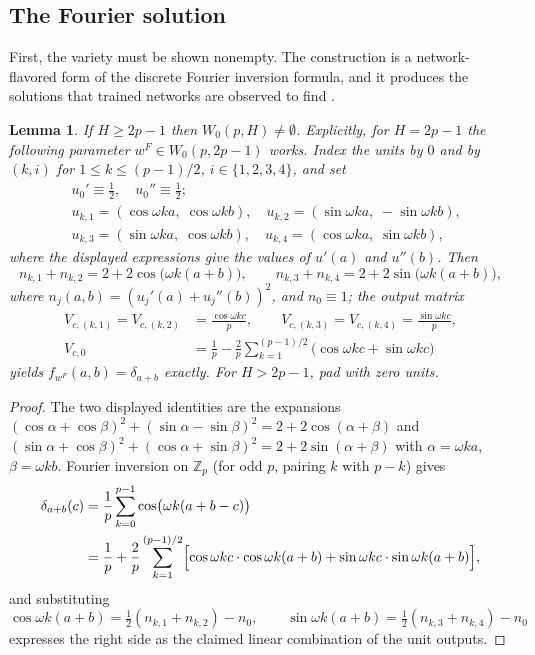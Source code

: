 \documentclass[11pt]{amsart}
\theoremstyle{plain}
\newtheorem{lemma}[theorem]{Lemma}
\theoremstyle{definition}
\newcommand{\Z}{\mathbb{Z}}
\begin{document}
\subsection{The Fourier solution}

First, the variety must be shown nonempty. The construction is a network-flavored form of the discrete Fourier inversion formula, and it produces the solutions that trained networks are observed to find \cite{nanda2023, gromov2023}.

\begin{lemma}\label{lem:fourier}
If $H \ge 2p - 1$ then $W_0(p, H) \neq \emptyset$. Explicitly, for $H = 2p-1$ the following parameter $w^F \in W_0(p, 2p-1)$ works. Index the units by $0$ and by $(k, i)$ for $1 \le k \le (p-1)/2$, $i \in \{1,2,3,4\}$, and set
\[
\begin{aligned}
&u_0' \equiv \tfrac12, \quad u_0'' \equiv \tfrac12; \\
&u_{k,1} = (\cos \omega k a,\; \cos \omega k b), \quad
u_{k,2} = (\sin \omega k a,\; -\sin \omega k b), \\
&u_{k,3} = (\sin \omega k a,\; \cos \omega k b), \quad
u_{k,4} = (\cos \omega k a,\; \sin \omega k b),
\end{aligned}
\]
where the displayed expressions give the values of $u'(a)$ and $u''(b)$. Then
\[
   n_{k,1} + n_{k,2} = 2 + 2\cos\bigl(\omega k (a+b)\bigr), \qquad
   n_{k,3} + n_{k,4} = 2 + 2\sin\bigl(\omega k (a+b)\bigr),
\]
where $n_j(a,b) = (u_j'(a) + u_j''(b))^2$, and $n_0 \equiv 1$; the output matrix
\begin{align*}
   V_{c,(k,1)} = V_{c,(k,2)} &= \frac{\cos \omega k c}{p}, \qquad
   V_{c,(k,3)} = V_{c,(k,4)} = \frac{\sin \omega k c}{p}, \\
   V_{c,0} &= \frac1p - \frac{2}{p}\sum_{k=1}^{(p-1)/2} \bigl(\cos \omega k c + \sin \omega k c\bigr)
\end{align*}
yields $f_{w^F}(a,b) = \delta_{a+b}$ exactly. For $H > 2p-1$, pad with zero units.
\end{lemma}

\begin{proof}
The two displayed identities are the expansions $(\cos\alpha + \cos\beta)^2 + (\sin\alpha - \sin\beta)^2 = 2 + 2\cos(\alpha+\beta)$ and $(\sin\alpha + \cos\beta)^2 + (\cos\alpha + \sin\beta)^2 = 2 + 2\sin(\alpha+\beta)$ with $\alpha = \omega k a$, $\beta = \omega k b$. Fourier inversion on $\Z_p$ (for odd $p$, pairing $k$ with $p - k$) gives
\begin{align*}
   \delta_{a+b}(c) &= \frac1p \sum_{k=0}^{p-1} \cos\bigl(\omega k (a+b-c)\bigr) \\
   &= \frac1p + \frac2p \sum_{k=1}^{(p-1)/2} \Bigl[ \cos \omega k c \cdot \cos \omega k (a+b) + \sin \omega k c \cdot \sin \omega k (a+b) \Bigr],
\end{align*}
and substituting
\[
   \cos\omega k(a{+}b) = \tfrac12(n_{k,1}{+}n_{k,2}) - n_0, \qquad
   \sin \omega k (a{+}b) = \tfrac12(n_{k,3}{+}n_{k,4}) - n_0
\]
expresses the right side as the claimed linear combination of the unit outputs.
\end{proof}
\end{document}
